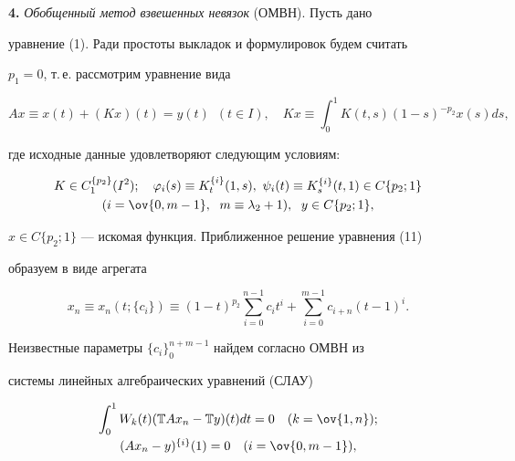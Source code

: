  


{\bf 4.} {\it Обобщенный метод взвешенных невязок} (ОМВН). Пусть дано 


уравнение (1). Ради простоты выкладок и формулировок будем считать 


$p_1=0$, т.\,е. рассмотрим уравнение вида 


\begin{equation} 


A x\equiv x(t)+(K x)(t)=y(t)\ \; (t\in I),\quad 


K x\equiv\int^1_0 K(t,s)(1-s)^{-p_2}x(s)ds, 


\end{equation} 


где исходные данные удовлетворяют следующим условиям: 


\begin{gather} 


K\in C^{\{p_2\}}_1(I^2);\quad \varphi_i(s)\equiv K^{\{i\}}_t(1,s), 


\ \psi_i(t)\equiv K^{\{i\}}_s(t,1)\in C\{p_2;1\} \\ 


(i=\ov{0,m-1},\ \; m\equiv\lambda_2+1),\ \; y\in C\{p_2;1\},\notag 


\end{gather} 


$x\in C\{p_2;1\}$ --- искомая функция. Приближенное решение уравнения (11) 


образуем в виде агрегата 


\begin{equation} 


x_n\equiv x_n(t;\{c_i\})\equiv(1-t)^{p_2}\sum^{n-1}_{i=0} 


c_i t^i+\sum^{m-1}_{i=0}c_{i+n}(t-1)^i. 


\end{equation} 


Неизвестные параметры $\{c_i\}^{n+m-1}_0$ найдем согласно ОМВН из 


системы линейных алгебраических уравнений (СЛАУ) 


\begin{equation} 


\begin{array}{c} 


\displaystyle\int^1_0 W_k(t)(\Bbb T A x_n-\Bbb T y)(t)dt=0 


\quad (k=\ov{1,n});\\[3mm] 


(A x_n-y)^{\{i\}}(1)=0\quad (i=\ov{0,m-1}), 


\end{array} 


\end{equation} 


